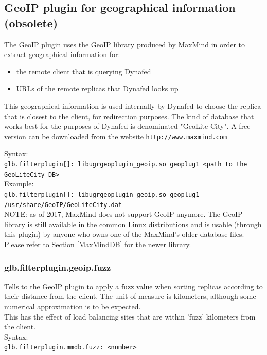 \documentclass[12pt]{article} %
\begin{document}
\subsection{GeoIP plugin for geographical information (obsolete)}
The GeoIP plugin uses the GeoIP library produced by MaxMind \cite{geoip} in order to extract geographical information for:

\begin{itemize}
\item the remote client that is querying Dynafed
\item URLs of the remote replicas that Dynafed looks up
\end{itemize}


 This geographical information is used internally by Dynafed to choose the replica that is closest to the client, for redirection
purposes. The kind of database that works best for the purposes of Dynafed is denominated "GeoLite City". A free version can
be downloaded from the website \lstinline"http://www.maxmind.com"

Syntax:\\
\lstinline"glb.filterplugin[]: libugrgeoplugin_geoip.so geoplug1 <path to the GeoLiteCity DB>"\\

Example:\\
\lstinline"glb.filterplugin[]: libugrgeoplugin_geoip.so geoplug1 /usr/share/GeoIP/GeoLiteCity.dat"\\

 NOTE: as of 2017, MaxMind does not support GeoIP anymore. The GeoIP library is still available in the common Linux distributions and
 is usable (through this plugin) by anyone who owns one of the MaxMind's older database files. Please refer to Section \ref{MaxMindDB} for
 the newer library.

\subsubsection{glb.filterplugin.geoip.fuzz}
Tells to the GeoIP plugin to apply a fuzz value when sorting replicas according to their distance from the client. The unit of measure is kilometers, although some numerical approximation is to be expected.\\
This has the effect of load balancing sites that are within 'fuzz' kilometers from the client.\\


Syntax:\\
\lstinline"glb.filterplugin.mmdb.fuzz: <number>"
\\
\end{document}
